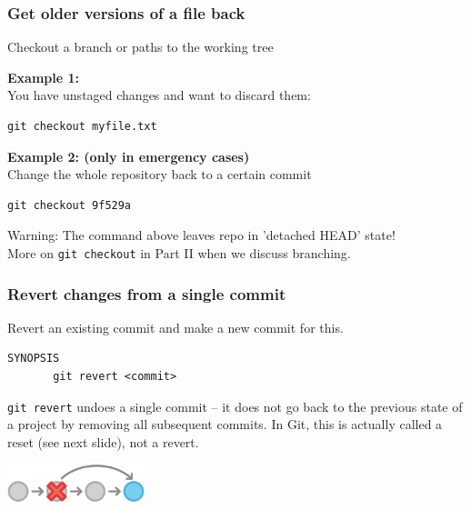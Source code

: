 \documentclass[handout,notes]{gittalk}
\newcommand{\hlcommand}[1]{ %
\colorbox{base3}{\small \texttt{#1}}
}
\begin{document}
\begin{frame}[fragile]
\frametitle{Get older versions of a file back}
\begin{tcolorbox}[title=git checkout]
Checkout a branch or paths to the working tree
\end{tcolorbox}
\vspace*{0.5em}
\textbf{Example 1:}\\
You have unstaged changes and want to discard them:\\[0.5em]
\begin{lstlisting}[basicstyle=\normalsize\ttfamily]
git checkout myfile.txt
\end{lstlisting}
\vspace*{0.5em}
\textbf{Example 2: (only in emergency cases)}\\
Change the whole repository back to a certain commit\\[0.5em]
\begin{lstlisting}[basicstyle=\normalsize\ttfamily]
git checkout 9f529a
\end{lstlisting}
Warning: The command above leaves repo in 'detached HEAD' state!\\
More on \hlcommand{git checkout} in Part II when we discuss branching.
\end{frame}


\begin{frame}[fragile]
\frametitle{Revert changes from a single commit}
\begin{tcolorbox}[title=git revert]
Revert an existing commit and make a new commit for this.
\begin{lstlisting}
SYNOPSIS
       git revert <commit>
\end{lstlisting}
\end{tcolorbox}

\vspace*{1em}
\texttt{git revert} undoes a single commit -- it does not go
back to the previous state of a project by removing all subsequent 
commits.
In Git, this is actually called a reset (see next slide), not a revert.
\begin{center}
\includegraphics[width=0.3\textwidth]{./img/git-tutorial_changes-revert}
\end{center}
\end{frame}
\end{document}
